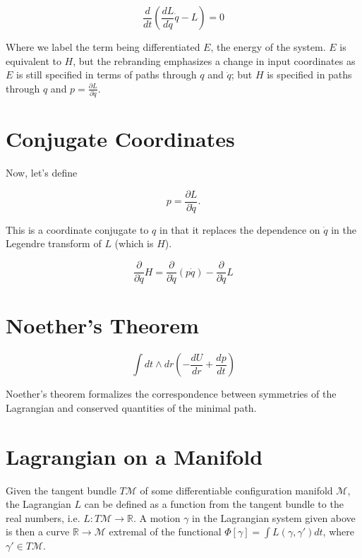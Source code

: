 \documentclass{article}\usepackage[]{graphicx}\usepackage[]{color}
\newcommand{\pd}{\frac{\partial }{\partial \dot{q}}}
\begin{document}
\begin{equation}
\frac{d}{dt}
\left( \frac{dL}{d\dot{q}}\dot{q}-L\right)=0
\end{equation}

Where we label the term being differentiated $E$, the energy of the system. $E$ is equivalent to $H$, but the rebranding emphasizes a change in input coordinates as $E$ is still specified in terms of paths through $q$ and $\dot{q}$; but $H$ is specified in paths through $q$ and $p=\frac{\partial L}{\partial \dot{q}}$. 


\section{Conjugate Coordinates}

Now, let's define

\begin{equation}
p=\frac{\partial L}{\partial \dot{q}}.
\end{equation}



This is a coordinate conjugate to $q$ in that it replaces the dependence on $\dot{q}$ in the Legendre transform of $L$ (which is $H$). 

$$
\frac{\partial }{\partial \dot{q}}H=\pd\left( p\dot{q} \right)-\pd L
$$

\section{Noether's Theorem}


$$
\int dt\wedge dr \left( 
-\frac{dU}{dr}+\frac{dp}{dt}
 \right)
$$


Noether's theorem formalizes the correspondence between symmetries of the Lagrangian and conserved quantities of the minimal path.


\pagebreak


\section{Lagrangian on a Manifold}
Given the tangent bundle $T\mathcal{M}$ of some differentiable configuration manifold $\mathcal{M}$, the Lagrangian $L$ can be defined as a function from the tangent bundle to the real numbers, i.e. $L:T\mathcal{M}\rightarrow\mathbb{R}$. A motion $\gamma$ in the Lagrangian system given above is then a curve $\mathbb{R}\rightarrow\mathcal{M}$ extremal of the functional $\Phi[\gamma]=\int L(\gamma ,\gamma')dt$, where $\gamma'\in T\mathcal{M}$.










\pagebreak


{}

\end{document}
